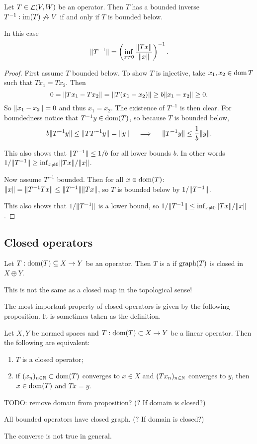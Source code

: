 \begin{proposition} \label{boundedBelow}
Let $T\in \mathop{\mathcal{L}}(V, W)$ be an operator. Then $T$ has a bounded inverse $T^{-1}: \operatorname{im}(T)\not\to V$ \textup{if and only if} $T$ is bounded below.

In this case
\[ \lVert T^{-1}\rVert = \left(\inf_{x\neq 0}\frac{\lVert Tx\rVert}{\lVert x\rVert}\right)^{-1}. \]
\end{proposition}
\begin{proof}
First assume $T$ bounded below.
To show $T$ is injective, take $x_1,x_2\in \operatorname{dom} T$ such that $Tx_1 = Tx_2$. Then
\[ 0 = \lVert Tx_1 - Tx_2\rVert = \lVert T(x_1 - x_2)\rVert \geq b\lVert x_1 - x_2\rVert \geq 0. \]
So $\lVert x_1 - x_2\rVert = 0$ and thus $x_1=x_2$.
The existence of $T^{-1}$ is then clear. For boundedness notice that $T^{-1}y \in \operatorname{dom}(T)$, so because $T$ is bounded below,
\[ b\lVert T^{-1}y\rVert \leq \lVert TT^{-1}y\rVert = \lVert y\rVert \quad\implies\quad \lVert T^{-1}y\rVert \leq \frac{1}{b}\lVert y\rVert. \]

This also shows that $\lVert T^{-1}\rVert \leq 1/b$ for all lower bounds $b$. In other words $1/\lVert T^{-1}\rVert \geq \inf_{x\neq 0}\lVert Tx\rVert/\lVert x\rVert$.

Now assume $T^{-1}$ bounded. Then for all $x\in\operatorname{dom}(T)$: $\lVert x\rVert = \lVert T^{-1}Tx\rVert \leq \lVert T^{-1}\rVert\lVert Tx\rVert$, so $T$ is bounded below by $1/\lVert T^{-1}\rVert$.

This also shows that $1/\lVert T^{-1}\rVert$ is a lower bound, so $1/\lVert T^{-1}\rVert \leq \inf_{x\neq 0}\lVert Tx\rVert/\lVert x\rVert$.
\end{proof}

\subsection{Closed operators}
\begin{definition}
Let $T:\operatorname{dom}(T)\subseteq X\to Y$ be an operator. Then $T$ is a  if $\operatorname{graph}(T)$ is closed in $X\oplus Y$.
\end{definition}
This is not the same as a closed map in the topological sense!

The most important property of closed operators is given by the following proposition. It is sometimes taken as the definition.
\begin{proposition} \label{closedGraphEquivalence}
Let $X,Y$ be normed spaces and $T: \operatorname{dom}(T)\subset X \to Y$ be a linear operator. Then
the following are equivalent:
\begin{enumerate}
\item $T$ is a closed operator;
\item if $(x_n)_{n\in\mathbb{N}}\subset \operatorname{dom}(T)$ converges to $x\in X$ and $(Tx_n)_{n\in\mathbb{N}}$ converges to $y$, then $x\in\operatorname{dom}(T)$ and $Tx = y$.
\end{enumerate}
\end{proposition}
TODO: remove domain from proposition? (? If domain is closed?)
\begin{corollary}
All bounded operators have closed graph. (? If domain is closed?)
\end{corollary}
The converse is not true in general.

